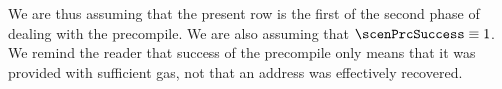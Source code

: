 \begin{center}
\end{center}
We are thus assuming that the present row is the first of the second phase of dealing with the \instEcrecover{} precompile.
We are also assuming that $\scenPrcSuccess \equiv 1$.
We remind the reader that success of the \instEcrecover{} precompile only means that it was provided with sufficient gas, not that an address was effectively recovered.
